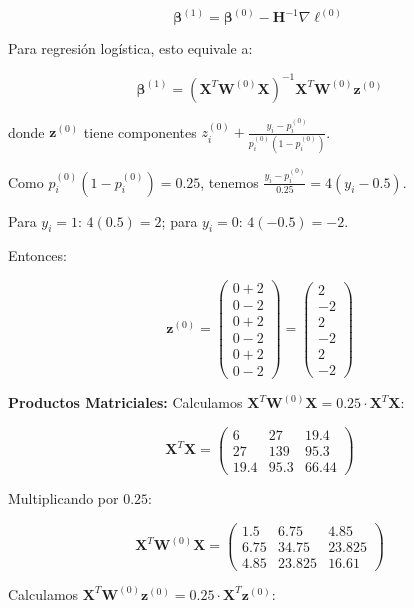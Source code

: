 \documentclass[12pt]{article}
\begin{document}
\[
\boldsymbol{\beta}^{(1)} = \boldsymbol{\beta}^{(0)} - \mathbf{H}^{-1} \nabla \ell^{(0)}
\]

Para regresión logística, esto equivale a:

\[
\boldsymbol{\beta}^{(1)} = (\mathbf{X}^T \mathbf{W}^{(0)} \mathbf{X})^{-1} \mathbf{X}^T \mathbf{W}^{(0)} \mathbf{z}^{(0)}
\]

donde $\mathbf{z}^{(0)}$ tiene componentes $z_i^{(0)} + \frac{y_i - p_i^{(0)}}{p_i^{(0)}(1-p_i^{(0)})}$.

Como $p_i^{(0)}(1-p_i^{(0)}) = 0.25$, tenemos $\frac{y_i - p_i^{(0)}}{0.25} = 4(y_i - 0.5)$.

Para $y_i=1$: $4(0.5) = 2$; para $y_i=0$: $4(-0.5) = -2$.

Entonces:

\[
\mathbf{z}^{(0)} = 
\begin{pmatrix}
0 + 2 \\ 0 - 2 \\ 0 + 2 \\ 0 - 2 \\ 0 + 2 \\ 0 - 2
\end{pmatrix} = 
\begin{pmatrix}
2 \\ -2 \\ 2 \\ -2 \\ 2 \\ -2
\end{pmatrix}
\]

\textbf{Productos Matriciales:} Calculamos $\mathbf{X}^T \mathbf{W}^{(0)} \mathbf{X} = 0.25 \cdot \mathbf{X}^T \mathbf{X}$:

\[
\mathbf{X}^T \mathbf{X} =
\begin{pmatrix}
6 & 27 & 19.4 \\
27 & 139 & 95.3 \\
19.4 & 95.3 & 66.44
\end{pmatrix}
\]

Multiplicando por $0.25$:

\[
\mathbf{X}^T \mathbf{W}^{(0)} \mathbf{X} =
\begin{pmatrix}
1.5 & 6.75 & 4.85 \\
6.75 & 34.75 & 23.825 \\
4.85 & 23.825 & 16.61
\end{pmatrix}
\]

Calculamos $\mathbf{X}^T \mathbf{W}^{(0)} \mathbf{z}^{(0)} = 0.25 \cdot \mathbf{X}^T \mathbf{z}^{(0)}$:
\end{document}
